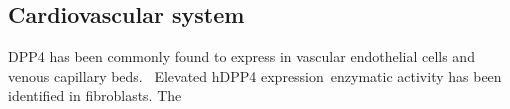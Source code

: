 \subsection{Cardiovascular system}
DPP4 has been commonly found to express in vascular endothelial cells and venous capillary beds.~\cite{Matheeussen2013,Shigeta2012} Elevated hDPP4 expression~\cite{Nemoto1999}enzymatic activity has been identified in fibroblasts. The  